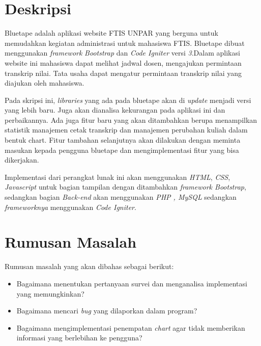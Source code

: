\documentclass[a4paper,twoside]{article}
\begin{document}
\title{\@judultopik}
\author{\nama \textendash \@npm} 

\newcommand{\nama}{Stephen Hadi}
\newcommand{\@npm}{2017730016}
\newcommand{\@judultopik}{Analisa Kekurangan dan Implementasi Perbaikan Perangkat Lunak Bluetape} %
\newcommand{\jumpemb}{1} %
\newcommand{\tanggal}{20/09/2020}


\maketitle


\section{Deskripsi}
Bluetape adalah aplikasi website FTIS UNPAR yang berguna untuk memudahkan kegiatan administrasi untuk mahasiswa FTIS.
Bluetape dibuat menggunakan \textit{framework} \textit{Bootstrap} dan \textit{Code Igniter} versi \textit{3}.Dalam aplikasi website ini mahasiswa dapat melihat jadwal dosen, mengajukan permintaan transkrip nilai. Tata usaha dapat mengatur permintaan transkrip nilai yang diajukan oleh mahasiswa.

Pada skripsi ini, \textit{libraries} yang ada pada bluetape akan di \textit{update} menjadi versi yang lebih baru. Juga akan dianalisa kekurangan pada aplikasi ini dan perbaikannya. Ada juga fitur baru yang akan ditambahkan berupa menampilkan statistik manajemen cetak transkrip dan manajemen perubahan kuliah dalam bentuk chart. Fitur tambahan selanjutnya akan dilakukan dengan meminta masukan kepada pengguna bluetape dan mengimplementasi fitur yang bisa dikerjakan.

Implementasi dari perangkat lunak ini akan menggunakan \textit{HTML}, \textit{CSS}, \textit{Javascript} untuk bagian tampilan dengan ditambahkan \textit{framework Bootstrap}, sedangkan bagian \textit{Back-end} akan menggunakan \textit{PHP , MySQL} sedangkan \textit{frameworknya} menggunakan \textit{Code Igniter}.

\section{Rumusan Masalah}
Rumusan masalah yang akan dibahas sebagai berikut:
\begin{itemize}
	\item Bagaimana menentukan pertanyaan survei dan menganalisa implementasi yang memungkinkan?
	\item Bagaimana mencari \textit{bug} yang dilaporkan dalam program? 
	\item Bagaimana mengimplementasi penempatan \textit{chart} agar tidak memberikan informasi yang berlebihan ke pengguna?
\end{itemize}
\end{document}
